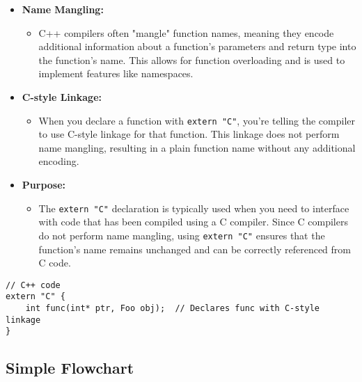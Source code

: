 \begin{itemize}
    \item \textbf{Name Mangling:}
    \begin{itemize}
        \item C++ compilers often "mangle" function names, meaning they encode additional information about a function's parameters and return type into the function's name. This allows for function overloading and is used to implement features like namespaces.
    \end{itemize}
    
    \item \textbf{C-style Linkage:}
    \begin{itemize}
        \item When you declare a function with \texttt{extern "C"}, you're telling the compiler to use C-style linkage for that function. This linkage does not perform name mangling, resulting in a plain function name without any additional encoding.
    \end{itemize}
    
    \item \textbf{Purpose:}
    \begin{itemize}
        \item The \texttt{extern "C"} declaration is typically used when you need to interface with code that has been compiled using a C compiler. Since C compilers do not perform name mangling, using \texttt{extern "C"} ensures that the function's name remains unchanged and can be correctly referenced from C code.
    \end{itemize}
\end{itemize}

\begin{tcolorbox}[title=Extern C]
\begin{verbatim}
// C++ code
extern "C" {
    int func(int* ptr, Foo obj);  // Declares func with C-style linkage
}
\end{verbatim}
\end{tcolorbox}


\subsection{}



\subsection{Simple Flowchart}

